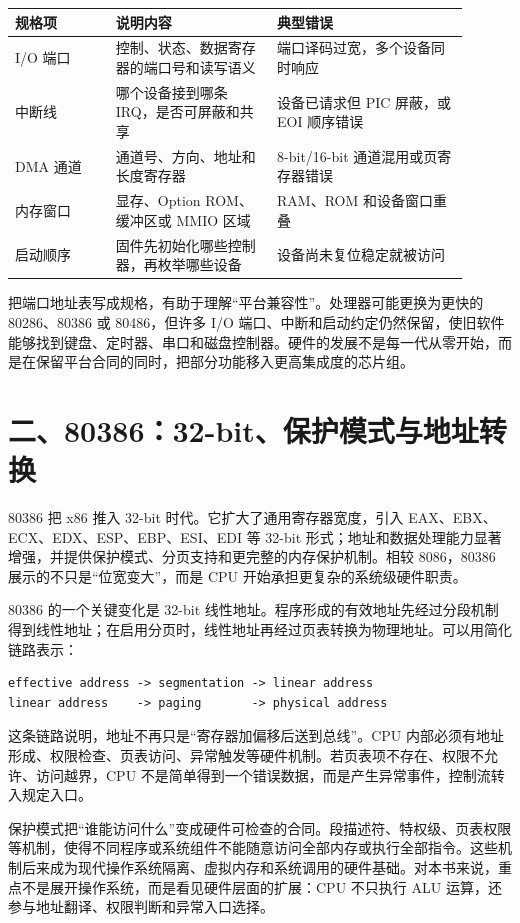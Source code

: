\begin{longtable}{L{0.2\linewidth}L{0.32\linewidth}L{0.38\linewidth}}
\toprule
规格项 & 说明内容 & 典型错误 \\
\midrule
I/O 端口 & 控制、状态、数据寄存器的端口号和读写语义 & 端口译码过宽，多个设备同时响应 \\
中断线 & 哪个设备接到哪条 IRQ，是否可屏蔽和共享 & 设备已请求但 PIC 屏蔽，或 EOI 顺序错误 \\
DMA 通道 & 通道号、方向、地址和长度寄存器 & 8-bit/16-bit 通道混用或页寄存器错误 \\
内存窗口 & 显存、Option ROM、缓冲区或 MMIO 区域 & RAM、ROM 和设备窗口重叠 \\
启动顺序 & 固件先初始化哪些控制器，再枚举哪些设备 & 设备尚未复位稳定就被访问 \\
\bottomrule
\end{longtable}

把端口地址表写成规格，有助于理解“平台兼容性”。处理器可能更换为更快的 80286、80386 或 80486，但许多 I/O 端口、中断和启动约定仍然保留，使旧软件能够找到键盘、定时器、串口和磁盘控制器。硬件的发展不是每一代从零开始，而是在保留平台合同的同时，把部分功能移入更高集成度的芯片组。

\section{二、80386：32-bit、保护模式与地址转换}

80386 把 x86 推入 32-bit 时代。它扩大了通用寄存器宽度，引入 EAX、EBX、ECX、EDX、ESP、EBP、ESI、EDI 等 32-bit 形式；地址和数据处理能力显著增强，并提供保护模式、分页支持和更完整的内存保护机制。相较 8086，80386 展示的不只是“位宽变大”，而是 CPU 开始承担更复杂的系统级硬件职责。

80386 的一个关键变化是 32-bit 线性地址。程序形成的有效地址先经过分段机制得到线性地址；在启用分页时，线性地址再经过页表转换为物理地址。可以用简化链路表示：

\begin{lstlisting}
effective address -> segmentation -> linear address
linear address    -> paging       -> physical address
\end{lstlisting}

这条链路说明，地址不再只是“寄存器加偏移后送到总线”。CPU 内部必须有地址形成、权限检查、页表访问、异常触发等硬件机制。若页表项不存在、权限不允许、访问越界，CPU 不是简单得到一个错误数据，而是产生异常事件，控制流转入规定入口。

保护模式把“谁能访问什么”变成硬件可检查的合同。段描述符、特权级、页表权限等机制，使得不同程序或系统组件不能随意访问全部内存或执行全部指令。这些机制后来成为现代操作系统隔离、虚拟内存和系统调用的硬件基础。对本书来说，重点不是展开操作系统，而是看见硬件层面的扩展：CPU 不只执行 ALU 运算，还参与地址翻译、权限判断和异常入口选择。

